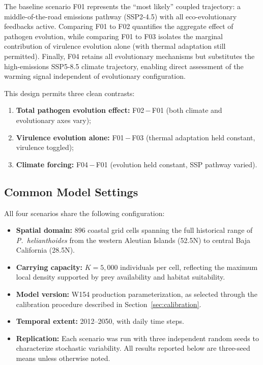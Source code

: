 \noindent
The baseline scenario F01 represents the ``most likely'' coupled
trajectory: a middle-of-the-road emissions pathway (SSP2-4.5) with all
eco-evolutionary feedbacks active.  Comparing F01 to F02 quantifies the
aggregate effect of pathogen evolution, while comparing F01 to F03
isolates the marginal contribution of virulence evolution alone (with
thermal adaptation still permitted).  Finally, F04 retains all
evolutionary mechanisms but substitutes the high-emissions SSP5-8.5
climate trajectory, enabling direct assessment of the warming signal
independent of evolutionary configuration.

This design permits three clean contrasts:
\begin{enumerate}
  \item \textbf{Total pathogen evolution effect:} F02\,$-$\,F01
        (both climate and evolutionary axes vary);
  \item \textbf{Virulence evolution alone:} F01\,$-$\,F03
        (thermal adaptation held constant, virulence toggled);
  \item \textbf{Climate forcing:} F04\,$-$\,F01
        (evolution held constant, SSP pathway varied).
\end{enumerate}

\subsection{Common Model Settings}

All four scenarios share the following configuration:
\begin{itemize}
  \item \textbf{Spatial domain:} 896 coastal grid cells spanning the
        full historical range of \textit{P.~helianthoides} from the
        western Aleutian Islands (52.5\textdegree N) to central Baja
        California (28.5\textdegree N).
  \item \textbf{Carrying capacity:} $K = 5{,}000$ individuals per cell,
        reflecting the maximum local density supported by prey
        availability and habitat suitability.
  \item \textbf{Model version:} W154 production parameterization, as
        selected through the calibration procedure described in
        Section~\ref{sec:calibration}.
  \item \textbf{Temporal extent:} 2012--2050, with daily time steps.
  \item \textbf{Replication:} Each scenario was run with three
        independent random seeds to characterize stochastic variability.
        All results reported below are three-seed means unless otherwise
        noted.
\end{itemize}

